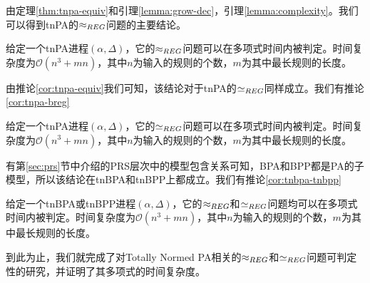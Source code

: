 由定理\ref{thm:tnpa-equiv}和引理\ref{lemma:grow-dec}，引理\ref{lemma:complexity}。我们可以得到tnPA的$\approx_{REG}$问题的主要结论。

\begin{thm}\label{thm:tnpa-wreg}
给定一个tnPA进程$(\alpha,\Delta)$，它的$\approx_{REG}$问题可以在多项式时间内被判定。时间复杂度为$\mathcal{O}(n^3+mn)$，其中$n$为输入的规则的个数，$m$为其中最长规则的长度。
\end{thm}

由推论\ref{cor:tnpa-equiv}我们可知，该结论对于tnPA的$\simeq_{REG}$同样成立。我们有推论\ref{cor:tnpa-breg}

\begin{cor}\label{cor:tnpa-breg}
给定一个tnPA进程$(\alpha,\Delta)$，它的$\simeq_{REG}$问题可以在多项式时间内被判定。时间复杂度为$\mathcal{O}(n^3+mn)$，其中$n$为输入的规则的个数，$m$为其中最长规则的长度。
\end{cor}

有第\ref{sec:prs}节中介绍的PRS层次中的模型包含关系可知，BPA和BPP都是PA的子模型，所以该结论在tnBPA和tnBPP上都成立。我们有推论\ref{cor:tnbpa-tnbpp}

\begin{cor}\label{cor:tnbpa-tnbpp}
给定一个tnBPA或tnBPP进程$(\alpha,\Delta)$，它的$\approx_{REG}$和$\simeq_{REG}$问题均可以在多项式时间内被判定。时间复杂度为$\mathcal{O}(n^3+mn)$，其中$n$为输入的规则的个数，$m$为其中最长规则的长度。
\end{cor}

到此为止，我们就完成了对Totally Normed PA相关的$\approx_{REG}$和$\simeq_{REG}$问题可判定性的研究，并证明了其多项式的时间复杂度。
